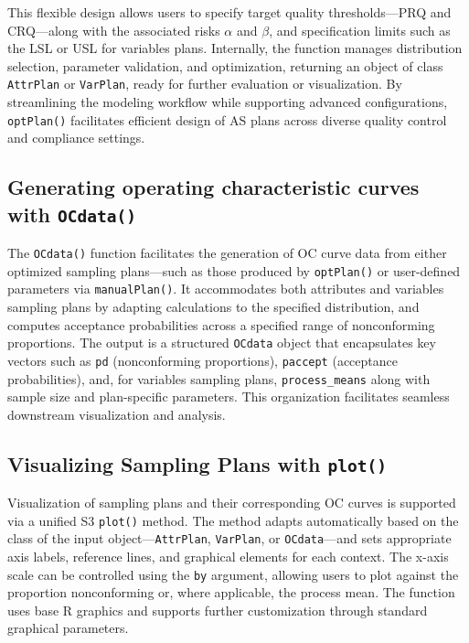 This flexible design allows users to specify target quality thresholds---PRQ and
CRQ---along with the associated risks \(\alpha\) and \(\beta\), and specification
limits such as the LSL or USL for variables plans. Internally, the function manages
distribution selection, parameter validation, and optimization, returning an
object of class \texttt{AttrPlan} or \texttt{VarPlan}, ready for further evaluation
or visualization. By streamlining the modeling workflow while supporting advanced
configurations, \texttt{optPlan()} facilitates efficient design of AS plans across
diverse quality control and compliance settings.

\subsection{\texorpdfstring{Generating operating characteristic curves with \texttt{OCdata()}}{Generating operating characteristic curves with OCdata()}}\label{generating-operating-characteristic-curves-with-ocdata}

The \texttt{OCdata()} function facilitates the generation of OC curve data from
either optimized sampling plans---such as those produced by \texttt{optPlan()} or
user-defined parameters via \texttt{manualPlan()}. It accommodates both attributes
and variables sampling plans by adapting calculations to the specified distribution,
and computes acceptance probabilities across a specified range of nonconforming
proportions.
The output is a structured \texttt{OCdata} object that encapsulates key vectors
such as \texttt{pd} (nonconforming proportions), \texttt{paccept} (acceptance probabilities),
and, for variables sampling plans, \texttt{process\_means} along with sample size and
plan-specific parameters. This organization facilitates seamless downstream
visualization and analysis.

\subsection{\texorpdfstring{Visualizing Sampling Plans with \texttt{plot()}}{Visualizing Sampling Plans with plot()}}\label{visualizing-sampling-plans-with-plot}

Visualization of sampling plans and their corresponding OC curves is supported
via a unified S3 \texttt{plot()} method. The method adapts automatically based on the
class of the input object---\texttt{AttrPlan}, \texttt{VarPlan}, or \texttt{OCdata}---and sets appropriate
axis labels, reference lines, and graphical elements for each context.
The x-axis scale can be controlled using the \texttt{by} argument, allowing users to
plot against the proportion nonconforming or, where applicable, the process mean.
The function uses base R graphics and supports further customization through
standard graphical parameters.

